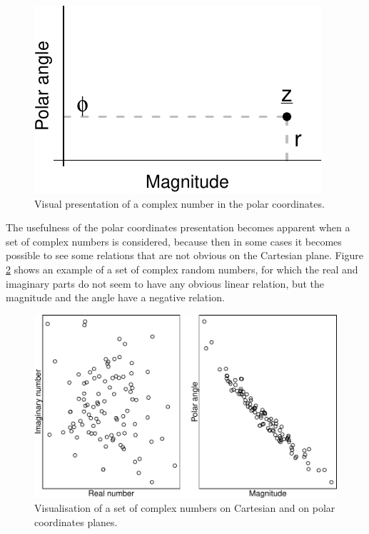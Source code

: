 \documentclass[
]{book}
\begin{document}
\begin{figure}
\centering
\includegraphics{Svetunkov---Svetunkov---Complex-Valued-Econometrics_files/figure-latex/complexPlanePolar-1.pdf}
\caption{\label{fig:complexPlanePolar}Visual presentation of a complex number in the polar coordinates.}
\end{figure}

The usefulness of the polar coordinates presentation becomes apparent when a set of complex numbers is considered, because then in some cases it becomes possible to see some relations that are not obvious on the Cartesian plane. Figure \ref{fig:complexCartesianvsPolar} shows an example of a set of complex random numbers, for which the real and imaginary parts do not seem to have any obvious linear relation, but the magnitude and the angle have a negative relation.

\begin{figure}
\centering
\includegraphics{Svetunkov---Svetunkov---Complex-Valued-Econometrics_files/figure-latex/complexCartesianvsPolar-1.pdf}
\caption{\label{fig:complexCartesianvsPolar}Visualisation of a set of complex numbers on Cartesian and on polar coordinates planes.}
\end{figure}
\end{document}
